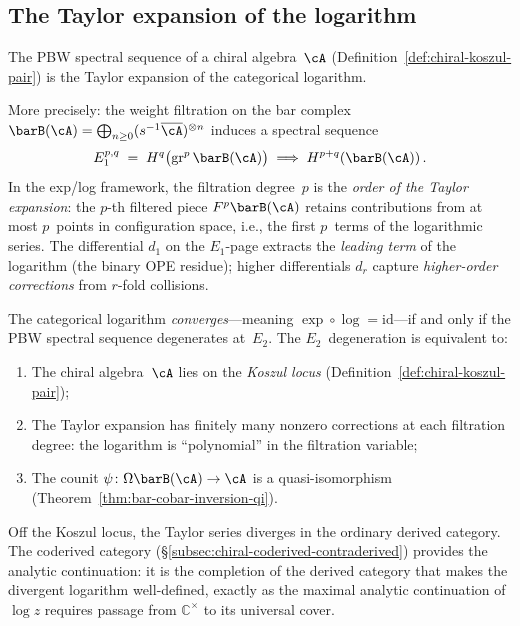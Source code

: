 \subsection{The Taylor expansion of the logarithm}
\label{subsec:taylor-expansion-log}

The PBW spectral sequence of a chiral algebra~$\cA$
(Definition~\ref{def:chiral-koszul-pair}) is the Taylor expansion of
the categorical logarithm.

More precisely: the weight filtration on the bar complex
$\barB(\cA) = \bigoplus_{n \geq 0} (s^{-1}\overline{\cA})^{\otimes n}$
induces a spectral sequence
\[
E_1^{p,q} \;=\; H^q\bigl(\mathrm{gr}^p\, \barB(\cA)\bigr)
\;\Longrightarrow\;
H^{p+q}(\barB(\cA))\,.
\]
In the exp/log framework, the filtration degree~$p$ is the
\emph{order of the Taylor expansion}: the $p$-th filtered piece
$F^p\barB(\cA)$ retains contributions from at most $p$~points in
configuration space, i.e., the first $p$~terms of the logarithmic
series.  The differential $d_1$ on the $E_1$-page extracts the
\emph{leading term} of the logarithm (the binary OPE residue); higher
differentials $d_r$ capture \emph{higher-order corrections} from
$r$-fold collisions.

\begin{proposition}
\label{prop:log-convergence}
The categorical logarithm \emph{converges}---meaning $\exp \circ \log
= \mathrm{id}$---if and only if the PBW spectral sequence degenerates
at~$E_2$.  The $E_2$~degeneration is equivalent to:
\begin{enumerate}[label=(\roman*)]
\item The chiral algebra~$\cA$ lies on the \emph{Koszul locus}
(Definition~\ref{def:chiral-koszul-pair});
\item The Taylor expansion has finitely many nonzero corrections at
each filtration degree: the logarithm is ``polynomial'' in the
filtration variable;
\item The counit $\psi \colon \Omega\barB(\cA) \to \cA$ is a
quasi-isomorphism
(Theorem~\ref{thm:bar-cobar-inversion-qi}).
\end{enumerate}
Off the Koszul locus, the Taylor series diverges in the ordinary
derived category.  The coderived category
(\S\ref{subsec:chiral-coderived-contraderived}) provides the analytic
continuation: it is the completion of the derived category that makes
the divergent logarithm well-defined, exactly as the maximal analytic
continuation of $\log z$ requires passage from $\mathbb{C}^\times$ to its
universal cover.
\end{proposition}

